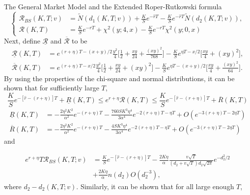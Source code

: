 \documentclass[unknownkeysallowed, compress]{beamer}
\theoremstyle{plain}
\begin{document}
\begin{frame}[allowframebreaks]{The General Market Model and the Extended Roper-Rutkowski formula}
\begin{equation*}%
\left\{
\begin{split}
\mathcal{R}_{BS}(K,T;v)& = \tilde{N}(d_1(K,T;v))+\frac{K}{S}e^{-\hat{r}T} - \frac{K}{S}e^{-\hat{r}T}\tilde{N}(d_2(K,T;v)),\\
\mathcal{R}(K,T)& = \frac{K}{S}e^{-rT}+\chi^2(y;4,x) - \frac{K}{S}e^{-rT}\chi^2(y;0,x) 
\end{split}
\right.
\end{equation*}
Next, define $\underline{\mathcal{R}}$ and $\overline{\mathcal{R}}$ to be 
\small
\begin{align*}
\underline{\mathcal{R}}(K,T)& = e^{(r+\eta)T -(x+y)/2}\frac{y^2}{4}\bigg[\frac{1}{2}+\frac{xy}{24}+\frac{(xy)^2}{768}\bigg] - \frac{K}{S}e^{\eta T - x/2}\bigg[\frac{xy}{4}+(xy)^2\bigg],\\
\overline{\mathcal{R}}(K,T)& = e^{(r+\eta)T -x/2}\frac{y^2}{4}\bigg[\frac{1}{2}+\frac{xy}{24}+(xy)^2\bigg] - \frac{K}{S}e^{\eta T - (x+y)/2}\bigg[\frac{xy}{4}+\frac{(xy)^2}{64}\bigg].
\end{align*}
\normalsize
By using the properties of the chi-square and normal distributions, it can be shown that for
sufficiently large $T$,
\begin{equation}\label{38}
\frac{K}{S}e^{-[\hat{r} - (r+\eta)]T}+\underline{R}(K,T)\leq e^{r+\eta}\mathcal{R}(K,T)\leq \frac{K}{S}e^{-[\hat{r} - (r+\eta)]T}+\overline{R}(K,T)
\end{equation}
\small
\begin{align}
\underline{R}(K,T) &= -\frac{2\eta^2K^2}{\alpha^2}e^{-(r+\eta)T}-\frac{760SK^3\eta^4}{3\alpha^4}e^{-2(r+\eta)T - \eta T}+O(e^{-3(r+\eta)T-2\eta T})\label{39}\\
\overline{R}(K,T) &= -\frac{2\eta^2K^2}{\alpha^2}e^{-(r+\eta)T}-\frac{4SK^3\eta^4}{3\alpha^4}e^{-2(r+\eta)T - \eta T}+O(e^{-3(r+\eta)T-2\eta T})\label{40}
\end{align}
\normalsize
and

\small
\begin{equation}\label{41}
\begin{split}
e^{r+\eta}T\mathcal{R}_{BS}(K,T;v) &= \frac{K}{S}e^{-[\hat{r} - (r+\eta)]T}  - \frac{2K\eta}{\alpha}\frac{v\sqrt{T}}{(d_2+v\sqrt{T})d_2\sqrt{2\pi}}e^{-d_2^2/2}\\
&+\frac{2K\eta}{\alpha}n(d_2)O(d_2^{-3}),
\end{split}
\end{equation}
\normalsize
where $d_2 - d_2(K,T;v)$. Similarly, it can be shown that for all large enough $T$,


\end{frame}
\end{document}
